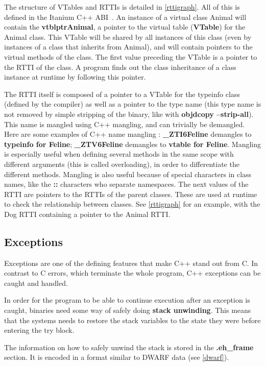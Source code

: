 \documentclass[a4paper,11pt,oneside]{report}
\begin{document}
The structure of VTables and RTTIs is detailed in \autoref{rttigraph}.
All of this is defined in the Itanium C++ ABI~\cite{cppabi}.
An instance of a virtual class Animal will contain the \textbf{vtblptrAnimal}, 
a pointer to the virtual table (\textbf{VTable}) for the Animal class.
This VTable will be shared by all instances of this class (even by instances
of a class that inherits from Animal), and will contain pointers to the virtual
methods of the class.
The first value preceding the VTable is a pointer to the RTTI of the class. A
program finds out the class inheritance of a class instance at runtime by
following this pointer.

The RTTI itself is composed of a pointer to a VTable for the typeinfo class
(defined by the compiler) as well as a pointer to the type name (this type 
name is not removed by simple stripping of the binary, like with 
\textbf{objdcopy --strip-all}).
This name is mangled using C++ mangling, and can trivially be demangled.
Here are some examples of C++ name mangling :
\textbf{\_ZTI6Feline} demangles to \textbf{typeinfo for Feline};
\textbf{\_ZTV6Feline} demangles to \textbf{vtable for Feline}.
Mangling is especially useful when defining several methods in the same scope 
with different arguments (this is called overloading), in order to
differentiate the different methods.
Mangling is also useful because of special characters in class names, like the
\textbf{::} characters who separate namespaces.
The next values of the RTTI are pointers to the RTTIs of the parent classes.
These are used at runtime to check the relationship between classes.
See \autoref{rttigraph} for an example, with the Dog RTTI containing a pointer 
to the Animal RTTI.


\subsection{Exceptions}
\label{exceptions}

Exceptions are one of the defining features that make C++ stand out from C.
In contrast to C errors, which terminate the whole program, C++ exceptions
can be caught and handled.

In order for the program to be able to continue execution after an exception
is caught, binaries need some way of safely doing \textbf{stack unwinding}.
This means that the systems needs to restore the stack variables to the state
they were before entering the try block.

The information on how to safely unwind the stack is stored in the
\textbf{.eh\_frame} section. It is encoded in a format similar to DWARF data
(see \autoref{dwarf}).
\end{document}
